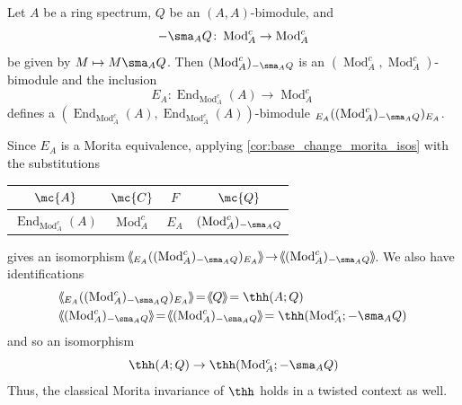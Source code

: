 \documentclass[11pt]{amsart}
\DeclareMathOperator{\End}{End}
\def\shvar#1#2{{\ensuremath{%
  \hspace{1mm}\makebox[-1mm]{$#1\langle$}\makebox[0mm]{$#1\langle$}\hspace{1mm}%
  {#2}%
  \makebox[1mm]{$#1\rangle$}\makebox[0mm]{$#1\rangle$}%
}}}
\def\sh{\shvar{}}
\begin{document}
\begin{example}\label{ex:twist_thh_morita}
Let $A$ be a ring spectrum,  $Q$ be an $(A,A)$-bimodule, and  
\[
-\sma_AQ\colon  \operatorname{Mod}^c_A \to \operatorname{Mod}^c_A
\] 
be given by $M \mapsto M \sma_A Q$.  Then $(\operatorname{Mod}^c_A)_{-\sma_AQ}$ is 
an  $(\operatorname{Mod}^c_A, \operatorname{Mod}^c_A)$-bimodule and the inclusion 
\[
  E_A\colon  \End_{ \operatorname{Mod}^c_A}(A) \to \operatorname{Mod}^c_A
\] 
defines a $(\End_{ \operatorname{Mod}^c_A}(A),\End_{ \operatorname{Mod}^c_A}(A))$-bimodule  $_{E_A}((\operatorname{Mod}^c_A)_{-\sma_AQ})_{E_A}$.  

Since $E_A$ is a Morita equivalence, applying \cref{cor:base_change_morita_isos} with the substitutions 
\begin{center}
\begin{tabular}{c|c|c|c}
$\mc{A}$
&$\mc{C}$
&$F$
&$\mc{Q}$
\\
\hline
$\End_{\operatorname{Mod}^c_A}(A)$
&$\operatorname{Mod}^c_A$
&$E_A$
&$(\operatorname{Mod}^c_A)_{-\sma_AQ}$
\end{tabular}
\end{center}
gives an isomorphism $\sh{_{E_A}((\operatorname{Mod}^c_A)_{-\sma_AQ})_{E_A}} \to \sh{(\operatorname{Mod}^c_A)_{-\sma_AQ}}$. We also have identifications
  \begin{align*}
    & \sh{ {_{E_A}( (\operatorname{Mod}^c_A)_{-\sma_AQ}})_{E_A}} = \sh{Q} = \thh(A; Q)\\
    &\sh{(\operatorname{Mod}^c_A)_{-\sma_AQ}} = \sh{(\operatorname{Mod}^c_A)_{-\sma_AQ}} = \thh(\operatorname{Mod}^c_A ; {-\sma_AQ}) 
  \end{align*}
  and so an isomorphism
  \[
  \thh(A; Q)\to \thh(\operatorname{Mod}^c_A; {-\sma_AQ})
  \]
  Thus, the classical Morita invariance of $\thh$ holds in a twisted context as well. 
\end{example}
\end{document}
